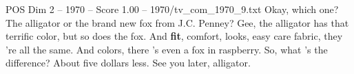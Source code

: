 \begin{textsample}{POS Dim 2 – 1970 – Score 1.00 – 1970/tv\_com\_1970\_9.txt}  \label{ex:f2_pos_060}
Okay, which one?
The alligator or the brand new fox from J.C.
Penney?
Gee, the alligator has that terrific color, but so does the fox.
And \textbf{fit}, comfort, looks, easy care fabric, they 're all the same.
And colors, there 's even a fox in raspberry.
So, what 's the difference?
About five dollars less.
See you later, alligator.

\end{textsample}
